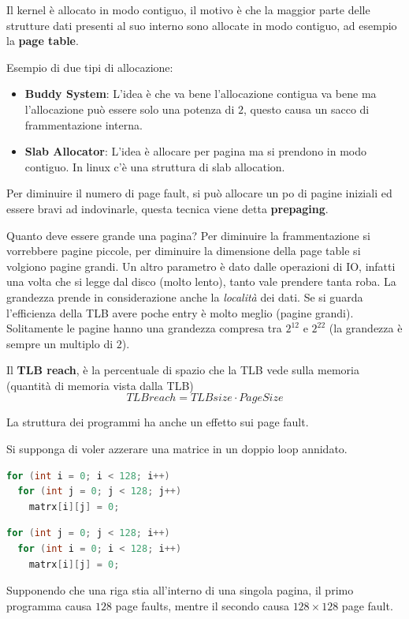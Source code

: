 \documentclass[12pt]{article}
\begin{document}
\hfill

Il kernel \`e allocato in modo contiguo, il motivo \`e che la maggior parte delle strutture dati presenti al suo interno sono allocate in modo contiguo, ad esempio la \textbf{page table}.

Esempio di due tipi di allocazione:
\begin{itemize}
  \item \textbf{Buddy System}: L'idea \`e che va bene l'allocazione contigua va bene ma l'allocazione pu\`o essere solo una potenza di $2$, questo causa un sacco di frammentazione interna.
  \item \textbf{Slab Allocator}: L'idea \`e allocare per pagina ma si prendono in modo contiguo. In linux c'\`e una struttura di slab allocation.
\end{itemize}


Per diminuire il numero di page fault, si pu\`o allocare un po di pagine iniziali ed essere bravi ad indovinarle, questa tecnica viene detta \textbf{prepaging}.

Quanto deve essere grande una pagina? Per diminuire la frammentazione si vorrebbere pagine piccole, per diminuire la dimensione della page table si volgiono pagine grandi. Un altro parametro \`e dato dalle operazioni di IO, infatti una volta che si legge dal disco (molto lento), tanto vale prendere tanta roba.  La grandezza prende in considerazione anche la \emph{localit\`a} dei dati. Se si guarda l'efficienza della TLB avere poche entry \`e molto meglio (pagine grandi). Solitamente le pagine hanno una grandezza compresa tra $2^{12}$ e $2^{22}$ (la grandezza \`e sempre un multiplo di $2$).

Il \textbf{TLB reach}, \`e la percentuale di spazio che la TLB vede sulla memoria (quantit\`a di memoria vista dalla TLB)
\[ TLBreach = TLBsize \cdot PageSize \]

La struttura dei programmi ha anche un effetto sui page fault.
\begin{example}{}{}
  Si supponga di voler azzerare una matrice in un doppio loop annidato.
  \begin{lstlisting}[language=c]
for (int i = 0; i < 128; i++)
  for (int j = 0; j < 128; j++)
    matrx[i][j] = 0;
  \end{lstlisting}
  \begin{lstlisting}[language=c]
for (int j = 0; j < 128; i++)
  for (int i = 0; i < 128; i++)
    matrx[i][j] = 0;
  \end{lstlisting}
  Supponendo che una riga stia all'interno di una singola pagina, il primo programma causa $128$ page faults, mentre il secondo causa $128 \times 128$ page fault.
\end{example}
\end{document}
